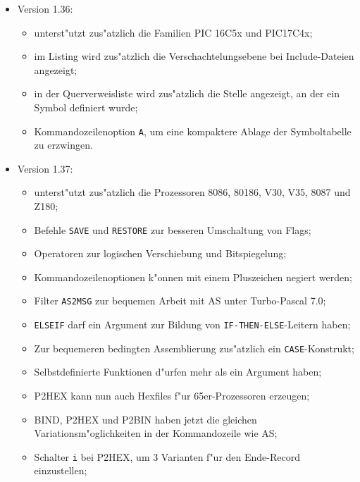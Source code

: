 \documentclass[12pt,a4paper,twoside]{report}
\newcommand{\tty}[1]{{\tt #1}}
\begin{document}
{\begin{itemize}
{\begin{itemize}
{            belegte Speicherbereiche abgepr"uft;}
      \item{Kommandozeilenoption \tty{C}, um eine Querverweisliste zu erzeugen.}
      \end{itemize}}
\item{Version 1.36:
      \begin{itemize}
      \item{unterst"utzt zus"atzlich die Familien PIC 16C5x und
            PIC17C4x;}
      \item{im Listing wird zus"atzlich die Verschachtelungsebene bei
            Include-Dateien angezeigt;}
      \item{in der Querverweisliste wird zus"atzlich die Stelle angezeigt,
            an der ein Symbol definiert wurde;}
      \item{Kommandozeilenoption \tty{A}, um eine kompaktere Ablage der
            Symboltabelle zu erzwingen.}
      \end{itemize}}
\item{Version 1.37:
      \begin{itemize}
      \item{unterst"utzt zus"atzlich die Prozessoren 8086, 80186, V30,
            V35, 8087 und Z180;}
      \item{Befehle \tty{SAVE} und \tty{RESTORE} zur besseren Umschaltung
            von Flags;}
      \item{Operatoren zur logischen Verschiebung und Bitspiegelung;}
      \item{Kommandozeilenoptionen k"onnen mit einem Pluszeichen negiert
            werden;}
      \item{Filter \tty{AS2MSG} zur bequemen Arbeit mit AS unter Turbo-Pascal 7.0;}
      \item{\tty{ELSEIF} darf ein Argument zur Bildung von 
            \tty{IF-THEN-ELSE}-Leitern haben;}
      \item{Zur bequemeren bedingten Assemblierung zus"atzlich ein 
            \tty{CASE}-Konstrukt;}
      \item{Selbstdefinierte Funktionen d"urfen mehr als ein Argument haben;}
      \item{P2HEX kann nun auch Hexfiles f"ur 65er-Prozessoren erzeugen;}
      \item{BIND, P2HEX und P2BIN haben jetzt die gleichen
            Variationsm"oglichkeiten in der Kommandozeile wie AS;}
      \item{Schalter \tty{i} bei P2HEX, um 3 Varianten f"ur den Ende-Record
            einzustellen;}

\end{itemize}}
\end{itemize}}
\end{document}
